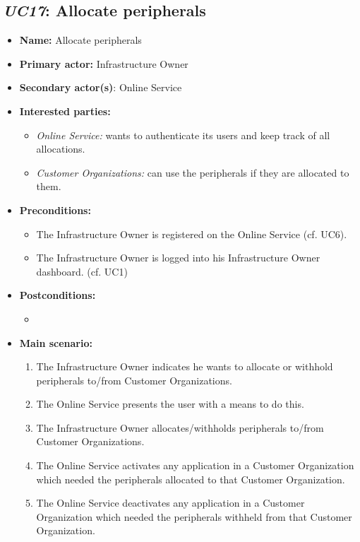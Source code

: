 \documentclass[english]{sareport}
\begin{document}
\subsection{\emph{UC17}: Allocate peripherals}
\begin{itemize}
    \item \textbf{Name:} Allocate peripherals
    \item \textbf{Primary actor:} Infrastructure Owner
    \item \textbf{Secondary actor(s)}: Online Service
    \item \textbf{Interested parties:} 
        \begin{itemize}
             \item \textit{Online Service:}  wants to authenticate its users and keep track of all allocations.
             \item \textit{Customer Organizations: } can use the peripherals if they are allocated to them.
        \end{itemize}

    \item \textbf{Preconditions:}
        \begin{itemize}
            \item The Infrastructure Owner is registered on the Online Service (cf. UC6).
            \item The Infrastructure Owner is logged into his Infrastructure Owner dashboard. (cf. UC1)
        \end{itemize}

    \item \textbf{Postconditions:}
        \begin{itemize}
            \item
        \end{itemize}

        
    \item \textbf{Main scenario:} 
    \begin{enumerate}
       \item The Infrastructure Owner indicates he wants to allocate or withhold peripherals to/from Customer Organizations.
       \item The Online Service presents the user with a means to do this.
       \item The Infrastructure Owner allocates/withholds peripherals to/from Customer Organizations.
       \item The Online Service activates any application in a Customer Organization which needed the peripherals allocated to that Customer Organization.
       \item The Online Service deactivates any application in a Customer Organization which needed the peripherals withheld from that Customer Organization.
    \end{enumerate}
\end{itemize}
\end{document}
